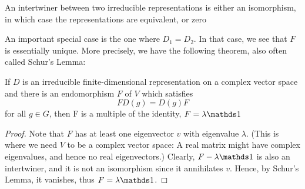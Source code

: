 \begin{lemma}
    An intertwiner between two irreducible representations is either
    an isomorphism, in which case the representations are equivalent,
    or zero
\end{lemma}

An important special case is the one where $D_1 = D_2$. In that case,
we see that $F$ is essentially unique. More precisely, we have the
following theorem, also often called Schur’s Lemma:
\begin{lemma}
    If $D$ is an irreducible finite-dimensional representation on a complex
vector space and there is an endomorphism $F$ of $V$ which satisfies 
\begin{equation}
    FD(g) = D(g) F
\end{equation}
for all $g\in G$, then F is a multiple of the identity, $F = \lambda
\id$
\end{lemma}
\begin{proof}
    Note that $F$ has at least one eigenvector $v$ with eigenvalue
    $\lambda$. (This is where we need $V$ to be a complex vector
    space: A real matrix might have complex eigenvalues, and hence no
    real eigenvectors.) Clearly, $F-\lambda\id$ is also an
    intertwiner, and it is not an isomorphism since it annihilates
    $v$. Hence, by Schur’s Lemma, it vanishes, thus $F = \lambda\id$.
\end{proof}

